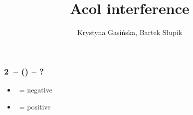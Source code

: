 \documentclass[12pt, a4paper]{article}
\title{Acol interference}
\author{Krystyna Gasińska, Bartek Słupik}
\begin{document}
\maketitle


\subsubsection*{2\clubs\ -- () -- ?}
\begin{itemize}
    \item \dbl\ = negative
    \item \pass\ = positive
\end{itemize}

\end{document}
